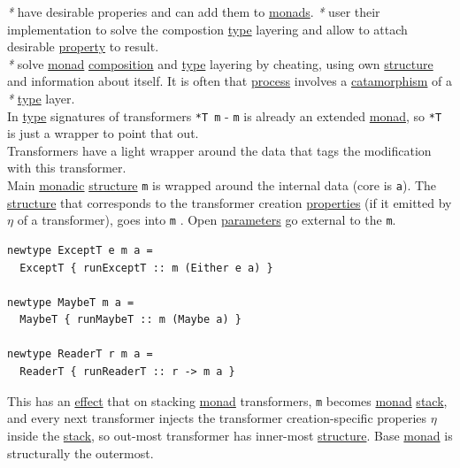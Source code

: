 \documentclass[a4paper,14pt,oneside]{book}
\begin{document}
\emph{*} have desirable properies and can add them to \hyperref[orgb4d8700]{monads}. \emph{*} user their implementation to solve the compostion \hyperref[org33d7e2e]{type} layering and allow to attach desirable \hyperref[orga548a30]{property} to result.\\

\emph{*} solve \hyperref[org27993ff]{monad} \hyperref[orgdb1d873]{composition} and \hyperref[org33d7e2e]{type} layering by cheating, using own \hyperref[org2f999c6]{structure} and information about itself. It is often that \hyperref[org24c34d9]{process} involves a \hyperref[orge16cdf6]{catamorphism} of a \emph{*} \hyperref[org33d7e2e]{type} layer.\\

In \hyperref[org33d7e2e]{type} signatures of transformers \texttt{*T m} - \texttt{m} is already an extended \hyperref[org27993ff]{monad}, so \texttt{*T} is just a wrapper to point that out.\\

Transformers have a light wrapper around the data that tags the modification with this transformer.\\

Main \hyperref[org6161b39]{monadic} \hyperref[org2f999c6]{structure} \texttt{m} is wrapped around the internal data (core is \texttt{a}). The \hyperref[org2f999c6]{structure} that corresponds to the transformer creation \hyperref[org39b32f5]{properties} (if it emitted by \(\eta\) of a transformer), goes into \texttt{m} . Open \hyperref[org2bf6456]{parameters} go external to the \texttt{m}.\\

\begin{verbatim}
newtype ExceptT e m a =
  ExceptT { runExceptT :: m (Either e a) }

newtype MaybeT m a =
  MaybeT { runMaybeT :: m (Maybe a) }

newtype ReaderT r m a =
  ReaderT { runReaderT :: r -> m a }
\end{verbatim}

This has an \hyperref[org35314ee]{effect} that on stacking \hyperref[org27993ff]{monad} transformers, \texttt{m} becomes \hyperref[org27993ff]{monad} \hyperref[org0bf13d8]{stack}, and every next transformer injects the transformer creation-specific properies \(\eta\) inside the \hyperref[org0bf13d8]{stack}, so out-most transformer has inner-most \hyperref[org2f999c6]{structure}. Base \hyperref[org27993ff]{monad} is structurally the outermost.\\
\end{document}

